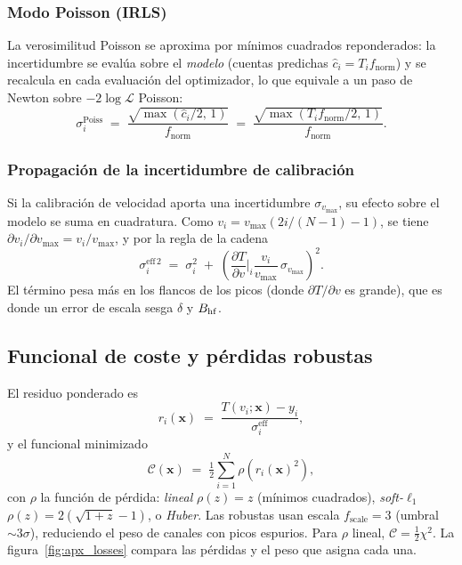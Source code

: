 \subsubsection{Modo Poisson (IRLS)}
La verosimilitud Poisson se aproxima por mínimos cuadrados reponderados: la
incertidumbre se evalúa sobre el \emph{modelo} (cuentas predichas
$\hat c_i = T_i f_{\text{norm}}$) y se recalcula en cada evaluación del
optimizador, lo que equivale a un paso de Newton sobre $-2\log\mathcal L$ Poisson:
\begin{equation}
  \sigma_i^{\text{Poiss}} \;=\; \frac{\sqrt{\max(\hat c_i/2,\,1)}}{f_{\text{norm}}}
  \;=\; \frac{\sqrt{\max(T_i f_{\text{norm}}/2,\,1)}}{f_{\text{norm}}}.
  \label{eq:sigma-poisson}
\end{equation}

\subsubsection{Propagación de la incertidumbre de calibración}\label{sec:calib}
Si la calibración de velocidad aporta una incertidumbre $\sigma_{v_{\max}}$, su
efecto sobre el modelo se suma en cuadratura. Como $v_i=v_{\max}(2i/(N-1)-1)$, se
tiene $\partial v_i/\partial v_{\max}=v_i/v_{\max}$, y por la regla de la cadena
\begin{equation}
  \sigma_i^{\text{eff}\,2} \;=\; \sigma_i^2 \;+\;
  \left(\frac{\partial T}{\partial v}\bigg|_i \frac{v_i}{v_{\max}}\,\sigma_{v_{\max}}\right)^{\!2}.
  \label{eq:calib}
\end{equation}
El término pesa más en los flancos de los picos (donde $\partial T/\partial v$ es
grande), que es donde un error de escala sesga $\delta$ y $B_{\mathrm{hf}}$.

\subsection{Funcional de coste y pérdidas robustas}\label{sec:cost}

El residuo ponderado es
\begin{equation}
  r_i(\bm x) \;=\; \frac{T(v_i;\bm x)-y_i}{\sigma_i^{\text{eff}}},
  \label{eq:residuo}
\end{equation}
y el funcional minimizado
\begin{equation}
  \mathcal C(\bm x) \;=\; \tfrac12 \sum_{i=1}^{N}\rho\!\left(r_i(\bm x)^2\right),
  \label{eq:cost}
\end{equation}
con $\rho$ la función de pérdida: \emph{lineal} $\rho(z)=z$ (mínimos cuadrados),
\emph{soft-}$\ell_1$ $\rho(z)=2(\sqrt{1+z}-1)$, o \emph{Huber}. Las robustas usan
escala $f_{\text{scale}}=3$ (umbral $\sim3\sigma$), reduciendo el peso de canales
con picos espurios. Para $\rho$ lineal, $\mathcal C=\tfrac12\chi^2$. La
figura~\ref{fig:apx_losses} compara las pérdidas y el peso que asigna cada una.

